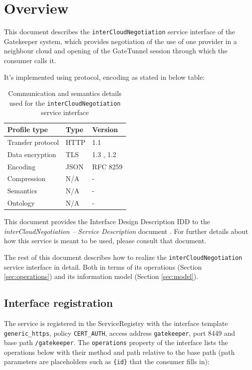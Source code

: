 \documentclass[a4paper]{arrowhead}
\begin{document}
\section{Overview}
\label{sec:overview}

This document describes the \texttt{inter\allowbreak{}Cloud\allowbreak{}Negotiation} service interface of the Gatekeeper system, which provides negotiation of the use of one provider in a neighbour cloud and opening of the GateTunnel session through which the consumer calls it.

It's implemented using protocol, encoding as stated in below table:
\begin{table}[ht!]
  \centering
  \begin{tabular}{|l|l|l|}
    \hline
    \rowcolor{gray!33} Profile type & Type & Version \\ \hline
    Transfer protocol & HTTP & 1.1 \cite{rfc9112} \\ \hline
    Data encryption & TLS & 1.3 \cite{rfc8446}, 1.2 \cite{rfc5246} \\ \hline
    Encoding & JSON & RFC 8259 \cite{rfc8259} \\ \hline
    Compression & N/A & - \\ \hline
    Semantics & N/A & - \\ \hline
    Ontology & N/A & - \\ \hline
  \end{tabular}
  \caption{Communication and semantics details used for the \texttt{inter\allowbreak{}Cloud\allowbreak{}Negotiation} service interface}
  \label{tab:comunication_semantics_profile}
\end{table}

This document provides the Interface Design Description IDD to the \textit{interCloudNegotiation -- Service Description} document \cite{gk-interCloudNegotiation-sd}.
For further details about how this service is meant to be used, please consult that document.

The rest of this document describes how to realize the \texttt{inter\allowbreak{}Cloud\allowbreak{}Negotiation} service
interface in detail. Both in terms of its operations (Section \ref{sec:operations}) and its information model (Section \ref{sec:model}).

\subsection{Interface registration}

The service is registered in the ServiceRegistry with the interface template \texttt{generic\_\allowbreak{}https}, policy \texttt{CERT\_\allowbreak{}AUTH}, access address \texttt{gatekeeper}, port 8449 and base path \texttt{/\allowbreak{}gatekeeper}. The \texttt{operations} property of the interface lists the operations below with their method and path relative to the base path (path parameters are placeholders such as \texttt{\{id\}} that the consumer fills in):
\end{document}
